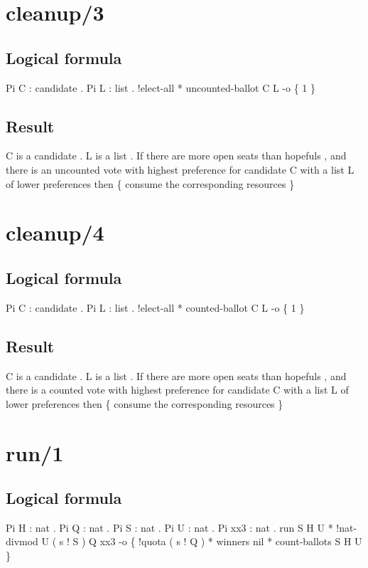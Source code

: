 \section{cleanup/3}
\subsection{Logical formula}
\begin{texto2}
	Pi C : candidate . Pi L : list . !elect-all * uncounted-ballot C L -o \{ 1 \}
\end{texto2}

\subsection{Result}
\begin{texto2}
	C is a candidate . L is a list . If there are more open seats than hopefuls , and there is an uncounted vote with highest preference for candidate C with a list L of lower preferences then \{ consume the corresponding resources \}
\end{texto2}

\section{cleanup/4}
\subsection{Logical formula}
\begin{texto2}
	Pi C : candidate . Pi L : list . !elect-all * counted-ballot C L -o \{ 1 \}
\end{texto2}

\subsection{Result}
\begin{texto2}
	C is a candidate . L is a list . If there are more open seats than hopefuls , and there is a counted vote with highest preference for candidate C with a list L of lower preferences then \{ consume the corresponding resources \}
\end{texto2}

\section{run/1}
\subsection{Logical formula}
\begin{texto2}
	Pi H : nat . Pi Q : nat . Pi S : nat . Pi U : nat . Pi xx3 : nat . run S H U * !nat-divmod U ( s ! S ) Q xx3 -o \{ !quota ( s ! Q ) * winners nil * count-ballots S H U \}
\end{texto2}

